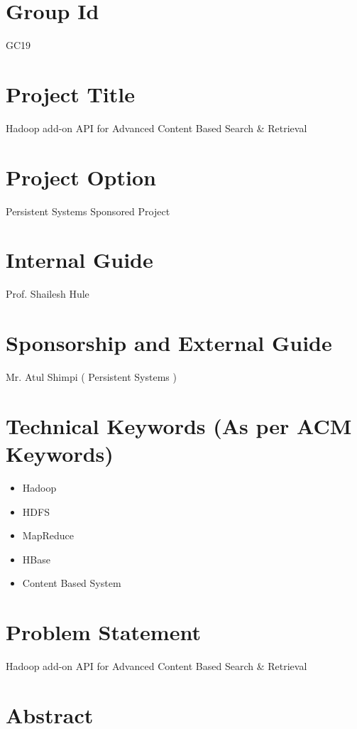 \documentclass[oneside,a4paper,12pt]{article}
\begin{document}
\section{Group Id}
GC19

\section{Project Title}
Hadoop add-on API for Advanced Content Based Search \& Retrieval

\section{ Project Option }
Persistent Systems Sponsored Project

\section{Internal Guide}
Prof. Shailesh Hule 

\section{ Sponsorship and External Guide} 
Mr. Atul Shimpi ( Persistent Systems ) 


\section{Technical Keywords (As per ACM Keywords)}
\begin{itemize}
\item Hadoop
\item HDFS
\item MapReduce
\item HBase
\item Content Based System
\end{itemize}



\section{Problem Statement}
\label{sec:problem}
Hadoop add-on API for Advanced Content Based Search \& Retrieval
\section{Abstract}
\end{document}
